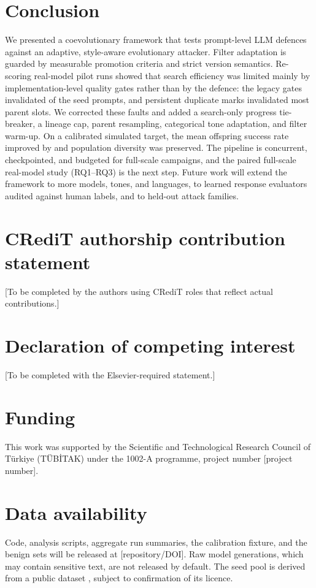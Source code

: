 \documentclass[preprint,12pt,authoryear]{elsarticle}
\begin{document}
\section{Conclusion}
\label{sec:conclusion}
We presented a coevolutionary framework that tests prompt-level LLM defences against an adaptive, style-aware evolutionary attacker. Filter adaptation is guarded by measurable promotion criteria and strict version semantics. Re-scoring real-model pilot runs showed that search efficiency was limited mainly by implementation-level quality gates rather than by the defence: the legacy gates invalidated \seedGarbledLegacyPct{} of the seed prompts, and persistent duplicate marks invalidated most parent slots. We corrected these faults and added a search-only progress tie-breaker, a lineage cap, parent resampling, categorical tone adaptation, and filter warm-up. On a calibrated simulated target, the mean offspring success rate improved by \abRelativeGain{} and population diversity was preserved. The pipeline is concurrent, checkpointed, and budgeted for full-scale campaigns, and the paired full-scale real-model study (RQ1--RQ3) is the next step. Future work will extend the framework to more models, tones, and languages, to learned response evaluators audited against human labels, and to held-out attack families.

\section*{CRediT authorship contribution statement}
[To be completed by the authors using CRediT roles that reflect actual contributions.]

\section*{Declaration of competing interest}
[To be completed with the Elsevier-required statement.]

\section*{Funding}
This work was supported by the Scientific and Technological Research Council of T\"urkiye (T\"UB\.ITAK) under the 1002-A programme, project number [project number].

\section*{Data availability}
Code, analysis scripts, aggregate run summaries, the calibration fixture, and the benign sets will be released at [repository/DOI]. Raw model generations, which may contain sensitive text, are not released by default. The seed pool is derived from a public dataset \citep{geekyrakshit2024dataset}, subject to confirmation of its licence.
\end{document}

